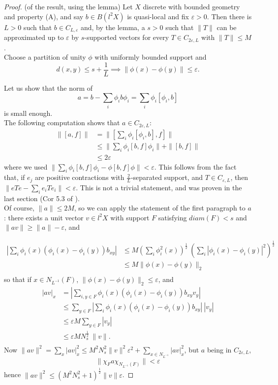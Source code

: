 \begin{proof}(of the result, using the lemma) 
Let $X$ discrete with bounded geometry and property (A), and say $b\in B(l^2 X)$ is quasi-local and fix $\varepsilon>0$. Then there is $L>0$ such that $b\in C_{L,\varepsilon}$ and, by the lemma, a $s>0$ such that $\| T \|$  can be approximated up to $\varepsilon$ by $s$-supported vectors for every $T\in C_{2\varepsilon, L}$ with $\| T\| \leq M$.\\

Choose a partition of unity $\phi$ with uniformly bounded support and 
\[ d(x,y)\leq s+\frac{1}{L} \implies \| \phi(x) - \phi(y) \| \leq \varepsilon.\]

Let us show that the norm of \[a= b-\sum_i \phi_i b \phi_i = \sum_i \phi_i [\phi_i , b] \]
is small enough.\\

The following computation shows that $a\in C_{2\varepsilon, L}$:
\[\begin{split}
\| [a,f]\|      & = \| [\sum_i \phi_i [\phi_i , b],f] \| 		\\
		& \leq \| \sum_i \phi_i [b,f] \phi_i \| + \| [b,f]\|    \\
		& \leq 2\varepsilon
\end{split}\]
where we used $\| \sum_i \phi_i [b,f] \phi_i - \phi[b,f] \phi\| < \varepsilon$. This follows from the fact that, if $e_j$ are positive contractions with $\frac{2}{L}$-separated support, and $T\in C_{\varepsilon,L}$, then $\| eTe-\sum_i e_i T e_i \| <\varepsilon $. This is not a trivial statement, and was proven in the last section (Cor 5.3 of \cite{spakula2018quasi}).\\

Of course, $\|a\| \leq 2M$, so we can apply the statement of the first paragraph to $a$: there exists a unit vector $v\in l^2X$ with support $F$ satisfying $diam(F) < s$ and $\| av \| \geq \|a\| -\varepsilon $, and 

\[\begin{split}
|\sum_{i} \phi_i(x) ( \phi_i(x)-\phi_i(y)) b_{xy}|   & \leq M (\sum_i \phi_i^2 (x) )^{\frac{1}{2}} \ (\sum_i |\phi_i (x) - \phi_i(y)|^2)^\frac{1}{2} \\
		& \leq M \|\phi(x) - \phi(y) \|_2 \\
\end{split}\]
so that if $x\in N_{L^{-1}}(F)$, $\|\phi(x) - \phi(y) \|_2 \leq \varepsilon$, and
\[\begin{split}
|av|_x  & = |\sum_{i, y\in F} \phi_i(x) ( \phi_i(x)-\phi_i(y)) b_{xy} v_y| \\
		& \leq \sum_{y\in F} |\sum_i\phi_i(x) ( \phi_i(x)-\phi_i(y)) b_{xy}| \ | v_y |\\
		& \leq \varepsilon M \sum_{ y\in F} | v_y |\\
		&  \leq \varepsilon M  N_{s}^{\frac{1}{2}}\  \| v \|.\\
\end{split}\]
Now $\| av \|^2 =  \sum_x |av|^2_x \leq  M^2  N_{s}^2  \| v \|^2 \varepsilon^2 +  \sum_{x\in N_{L^{-1}}} |av|^2_x$, but $a$ being in $C_{2\varepsilon, L}$, 
\[ \| \chi_{F} a \chi_{N_{L^{-1}}(F)}\| <\varepsilon \] hence $\| av \|^2 \leq (M^2  N_{s}^2 +1)^{\frac{1}{2}} \| v \| \varepsilon $.
\end{proof}

